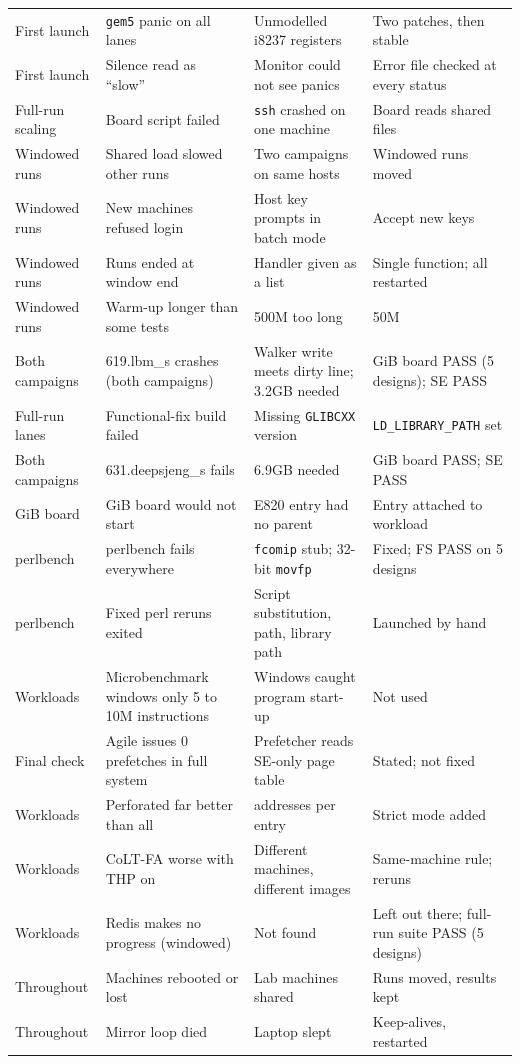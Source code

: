 \begin{longtable}{>{\raggedright\arraybackslash}p{1.6cm} >{\raggedright\arraybackslash}p{4.4cm} >{\raggedright\arraybackslash}p{5.2cm} >{\raggedright\arraybackslash}p{2.6cm}}
First launch & \texttt{gem5} panic on all lanes & Unmodelled i8237 registers & Two patches, then stable \\
First launch & Silence read as ``slow'' & Monitor could not see panics & Error file checked at every status \\
Full-run scaling & Board script failed & \texttt{ssh} crashed on one machine & Board reads shared files \\
Windowed runs & Shared load slowed other runs & Two campaigns on same hosts & Windowed runs moved \\
Windowed runs & New machines refused login & Host key prompts in batch mode & Accept new keys \\
Windowed runs & Runs ended at window end & Handler given as a list & Single function; all restarted \\
Windowed runs & Warm-up longer than some tests & 500M too long & 50M \\
Both campaigns & 619.lbm\_s crashes (both campaigns) & Walker write meets dirty line; 3.2GB needed & 12 GiB board PASS (5 designs); SE PASS \\
Full-run lanes & Functional-fix build failed & Missing \texttt{GLIBCXX} version & \texttt{LD\_LIBRARY\_PATH} set \\
Both campaigns & 631.deepsjeng\_s fails & 6.9GB needed & 12 GiB board PASS; SE PASS \\
12 GiB board & 12 GiB board would not start & E820 entry had no parent & Entry attached to workload \\
perlbench & perlbench fails everywhere & \texttt{fcomip} stub; 32-bit \texttt{movfp} & Fixed; FS PASS on 5 designs \\
perlbench & Fixed perl reruns exited & Script substitution, path, library path & Launched by hand \\
Workloads & Microbenchmark windows only 5 to 10M instructions & Windows caught program start-up & Not used \\
Final check & Agile issues 0 prefetches in full system & Prefetcher reads SE-only page table & Stated; not fixed \\
Workloads & Perforated far better than all & 512 addresses per entry & Strict mode added \\
Workloads & CoLT-FA worse with THP on & Different machines, different images & Same-machine rule; reruns \\
Workloads & Redis makes no progress (windowed) & Not found & Left out there; full-run suite PASS (5 designs) \\
Throughout & Machines rebooted or lost & Lab machines shared & Runs moved, results kept \\
Throughout & Mirror loop died & Laptop slept & Keep-alives, restarted \\
\bottomrule
\end{longtable}
\endgroup

